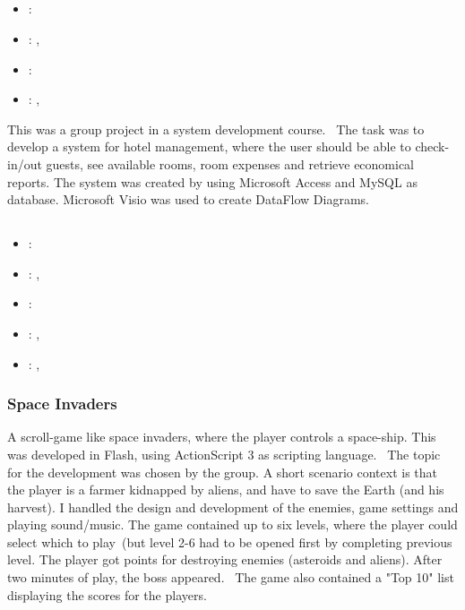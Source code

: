 \subsection[System Developing Project]{}
\label{sec:inf165_sys_dev}
\begin{itemize} 
	\item {}: 
	\item {}: , 
	\item {}: 
	\item {}: , 
\end{itemize} 
This was a group project in a system development course. 
The task was to develop a system for hotel management, where the user should be able to check-in/out guests, see available rooms, room expenses and retrieve economical reports.
The system was created by using Microsoft Access and MySQL as database. Microsoft Visio was used to create DataFlow Diagrams.

\subsection[Flash Programming]{}
\label{sec:flash_prog}
\begin{itemize} 
\item {}: 
\item {}: , 
\item {}: 
\item {}: , 
\item {}: , 
\end{itemize} 

\subsubsection{Space Invaders}
\label{sec:space_invaders}
A scroll-game like space invaders, where the player controls a space-ship. 
This was developed in Flash, using ActionScript 3 as scripting language. 
The topic for the development was chosen by the group. 
A short scenario context is that the player is a farmer kidnapped by aliens, and have to save the Earth (and his harvest).
\vspace{0.5em}\newline
I handled the design and development of the enemies, game settings and playing sound/music. 
The game contained up to six levels, where the player could select which to play (but level 2-6 had to be opened first by completing previous level. 
The player got points for destroying enemies (asteroids and aliens). 
After two minutes of play, the boss appeared. 
The game also contained a "Top 10" list displaying the scores for the players.

